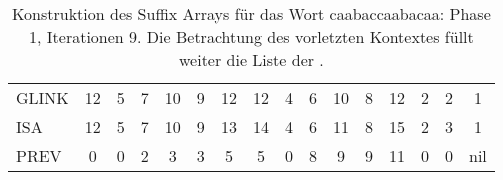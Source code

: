 \begin{table}[H]
\begin{adjustbox}{max width=\textwidth}
\begin{tabular}{lccccccccccccccc}
\multicolumn{1}{l|}{GLINK}   & 12                      & 5                         & 7                         & 10                         & 9                           & 12                        & 12                         & 4                       & 6                        & 10 & 8                       & 12 & 2                         & 2                         & 1   \\
\multicolumn{1}{l|}{ISA}     & 12                      & 5                         & 7                         & 10                         & 9                           & 13                        & 14                         & 4                       & 6                        & 11 & 8                       & 15 & 2                         & 3                         & 1   \\
\multicolumn{1}{l|}{PREV}    & 0                       & 0                         & 2                         & 3                          & 3                           & 5                         & 5                          & 0                       & 8                        & 9  & 9                       & 11 & \cellcolor[HTML]{\red}0 & \cellcolor[HTML]{\red}0 & nil
\end{tabular}
\end{adjustbox}

\caption[Konstruktion des Suffix Arrays für das Wort caabaccaabacaa: Phase 1, Iterationen 9]{Konstruktion des Suffix Arrays für das Wort caabaccaabacaa: Phase 1, Iterationen 9. Die Betrachtung des vorletzten Kontextes füllt weiter die Liste der \prevpointer.}
\label{table_complex_example_1_9} 
\end{table}

